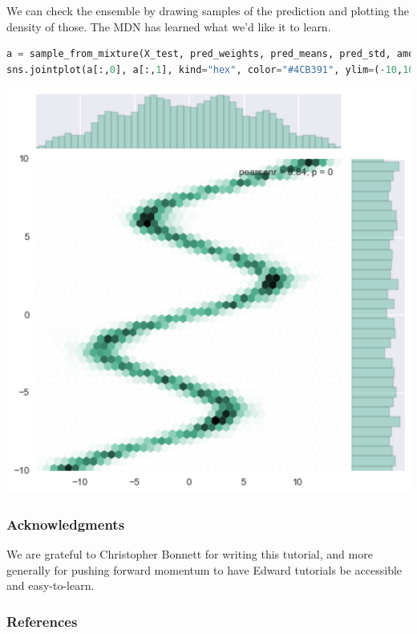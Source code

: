 We can check the ensemble by drawing samples of the prediction and
plotting the density of those. The MDN has learned what we'd like it
to learn.

\begin{lstlisting}[language=Python]
a = sample_from_mixture(X_test, pred_weights, pred_means, pred_std, amount=len(X_test))
sns.jointplot(a[:,0], a[:,1], kind="hex", color="#4CB391", ylim=(-10,10), xlim=(-14,14))
\end{lstlisting}

\includegraphics[width=700px]{images/mdn-fig3.png}

\subsubsection{Acknowledgments}

We are grateful to Christopher Bonnett for writing this tutorial, and
more generally for pushing forward momentum to have Edward tutorials
be accessible and easy-to-learn.

\subsubsection{References}\label{references}
